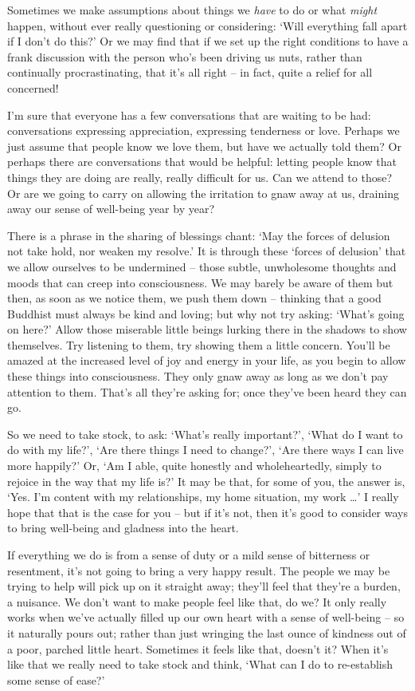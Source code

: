 Sometimes we make assumptions about things we \textit{have} to do or what \textit{might} happen, without ever really questioning or considering: `Will everything fall apart if I don't do this?' Or we may find that if we set up the right conditions to have a frank discussion with the person who's been driving us nuts, rather than continually procrastinating, that it's all right -- in fact, quite a relief for all concerned!

I'm sure that everyone has a few conversations that are waiting to be had: conversations expressing appreciation, expressing tenderness or love. Perhaps we just assume that people know we love them, but have we actually told them? Or perhaps there are conversations that would be helpful: letting people know that things they are doing are really, really difficult for us. Can we attend to those? Or are we going to carry on allowing the irritation to gnaw away at us, draining away our sense of well-being year by year?

There is a phrase in the sharing of blessings chant: `May the forces of delusion not take hold, nor weaken my resolve.' It is through these `forces of delusion' that we allow ourselves to be undermined -- those subtle, unwholesome thoughts and moods that can creep into consciousness. We may barely be aware of them but then, as soon as we notice them, we push them down -- thinking that a good Buddhist must always be kind and loving; but why not try asking: `What's going on here?' Allow those miserable little beings lurking there in the shadows to show themselves. Try listening to them, try showing them a little concern. You'll be amazed at the increased level of joy and energy in your life, as you begin to allow these things into consciousness. They only gnaw away as long as we don't pay attention to them. That's all they're asking for; once they've been heard they can go.

So we need to take stock, to ask: `What's really important?', `What do I want to do with my life?', `Are there things I need to change?', `Are there ways I can live more happily?' Or, `Am I able, quite honestly and wholeheartedly, simply to rejoice in the way that my life is?' It may be that, for some of you, the answer is, `Yes. I'm content with my relationships, my home situation, my work \ldots{}\thinspace' I really hope that that is the case for you -- but if it's not, then it's good to consider ways to bring well-being and gladness into the heart.

If everything we do is from a sense of duty or a mild sense of bitterness or resentment, it's not going to bring a very happy result. The people we may be trying to help will pick up on it straight away; they'll feel that they're a burden, a nuisance. We don't want to make people feel like that, do we? It only really works when we've actually filled up our own heart with a sense of well-being -- so it naturally pours out; rather than just wringing the last ounce of kindness out of a poor, parched little heart. Sometimes it feels like that, doesn't it? When it's like that we really need to take stock and think, `What can I do to re-establish some sense of ease?'

